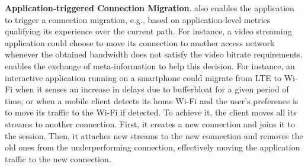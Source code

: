 \textbf{Application-triggered Connection Migration}. \tcpls also enables the
application to trigger a connection migration, e.g., based on application-level
metrics qualifying its experience over the current path. For instance, a video
streaming application could choose to move its connection to another access
network whenever the obtained bandwidth does not satisfy the video bitrate
requirements.
\tcpls enables the exchange of meta-information to help this decision.
For instance, an interactive application running on a smartphone could migrate
from LTE to Wi-Fi when it senses an increase in delays due to bufferbloat for a
given period of time, or when a mobile client detects its home Wi-Fi and the
user's preference is to move its traffic to the Wi-Fi if detected.
To achieve it, the client moves all its \tcpls streams to another \tcp
connection.
First, it creates a new \tcp connection and joins it to the \tcpls
session. Then, %
it attaches new streams to the new connection
and removes the old ones from the underperforming connection, effectively moving
the application traffic to the new connection.

